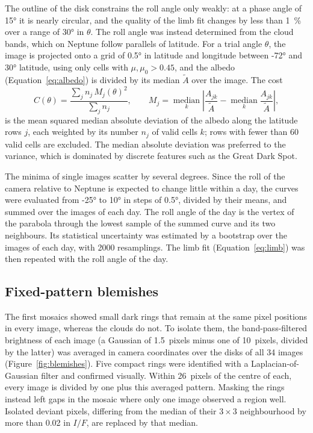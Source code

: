 \documentclass[11pt,a4paper]{article}
\begin{document}
The outline of the disk constrains the roll angle only weakly: at a phase angle of \ang{15} it is
nearly circular, and the quality of the limb fit changes by less than \SI{1}{\percent} over a range
of \ang{30} in $\theta$. The roll angle was instead determined from the cloud bands, which on
Neptune follow parallels of latitude. For a trial angle $\theta$, the image is projected onto a
grid of \ang{0.5} in latitude and longitude between \ang{-72} and \ang{30} latitude, using only
cells with $\mu, \mu_{0} > 0.45$, and the albedo (Equation~\ref{eq:albedo}) is divided by its
median $\tilde{A}$ over the image. The cost
\begin{equation}
C(\theta) = \frac{\sum_{j} n_{j}\, M_{j}(\theta)^{2}}{\sum_{j} n_{j}}, \qquad
M_{j} = \operatorname*{median}_{k} \left\lvert \frac{A_{jk}}{\tilde{A}} -
\operatorname*{median}_{k} \frac{A_{jk}}{\tilde{A}} \right\rvert,
\label{eq:cost}
\end{equation}
is the mean squared median absolute deviation of the albedo along the latitude rows $j$, each
weighted by its number $n_{j}$ of valid cells $k$; rows with fewer than 60 valid cells are excluded.
The median absolute deviation was preferred to the variance, which is dominated by discrete
features such as the Great Dark Spot.

The minima of single images scatter by several degrees. Since the roll of the camera relative to
Neptune is expected to change little within a day, the curves were evaluated from \ang{-25} to
\ang{10} in steps of \ang{0.5}, divided by their means, and summed over the images of each day. The
roll angle of the day is the vertex of the parabola through the lowest sample of the summed curve
and its two neighbours. Its statistical uncertainty was estimated by a bootstrap over the images of
each day, with 2000 resamplings. The limb fit (Equation~\ref{eq:limb}) was then repeated with the
roll angle of the day.

\subsection{Fixed-pattern blemishes}

The first mosaics showed small dark rings that remain at the same pixel positions in every image,
whereas the clouds do not. To isolate them, the band-pass-filtered brightness of each image (a
Gaussian of 1.5~pixels minus one of 10~pixels, divided by the latter) was averaged in camera
coordinates over the disks of all 34 images (Figure~\ref{fig:blemishes}). Five compact rings were
identified with a Laplacian-of-Gaussian filter and confirmed visually. Within 26~pixels of the
centre of each, every image is divided by one plus this averaged pattern. Masking the rings instead
left gaps in the mosaic where only one image observed a region well. Isolated deviant pixels,
differing from the median of their $3\times3$ neighbourhood by more than 0.02 in $I/F$, are
replaced by that median.
\end{document}
